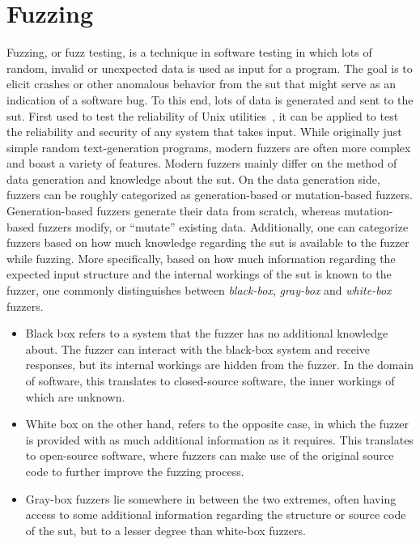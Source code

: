 \section{Fuzzing}
Fuzzing, or fuzz testing, is a technique in software testing in which lots of random, invalid or unexpected data is used as input for a program. The goal is to elicit crashes or other anomalous behavior from the \ac{sut} that might serve as an indication of a software bug. To this end, lots of data is generated and sent to the \ac{sut}. First used to test the reliability of Unix utilities~\cite{miller1990empirical}, it can be applied to test the reliability and security of any system that takes input. While originally just simple random text-generation programs, modern fuzzers are often more complex and boast a variety of features. Modern fuzzers mainly differ on the method of data generation and knowledge about the \ac{sut}. On the data generation side, fuzzers can be roughly categorized as generation-based or mutation-based fuzzers. Generation-based fuzzers generate their data from scratch, whereas mutation-based fuzzers modify, or ``mutate'' existing data. Additionally, one can categorize fuzzers based on how much knowledge regarding the \ac{sut} is available to the fuzzer while fuzzing. More specifically, based on how much information regarding the expected input structure and the internal workings of the \ac{sut} is known to the fuzzer, one commonly distinguishes between \emph{black-box}, \emph{gray-box} and \emph{white-box} fuzzers. 

\begin{itemize}
	\item Black box refers to a system that the fuzzer has no additional knowledge about. The fuzzer can interact with the black-box system and receive responses, but its internal workings are hidden from the fuzzer. In the domain of software, this translates to closed-source software, the inner workings of which are unknown.
	\item White box on the other hand, refers to the opposite case, in which the fuzzer is provided with as much additional information as it requires. This translates to open-source software, where fuzzers can make use of the original source code to further improve the fuzzing process. 
	\item Gray-box fuzzers lie somewhere in between the two extremes, often having access to some additional information regarding the structure or source code of the \ac{sut}, but to a lesser degree than white-box fuzzers.
\end{itemize}

